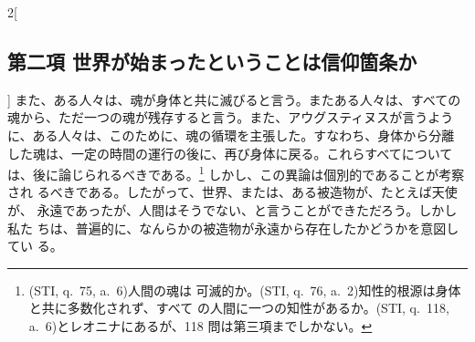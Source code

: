 \documentclass[paper=a4paper,fontsize=10pt,jafontsize=9pt,titlepage]{jlreq}
\begin{document}
\begin{paracol}{2}[\subsection{第二項 世界が始まったということは信仰箇条か}]
また、ある人々は、魂が身体と共に滅びると言う。またある人々は、すべての
魂から、ただ一つの魂が残存すると言う。また、アウグスティヌスが言うよう
に、ある人々は、このために、魂の循環を主張した。すなわち、身体から分離
した魂は、一定の時間の運行の後に、再び身体に戻る。これらすべてについて
は、後に論じられるべきである。\footnote {(STI, q.~75, a.~6)人間の魂は
可滅的か。(STI, q.~76, a.~2)知性的根源は身体と共に多数化されず、すべて
の人間に一つの知性があるか。(STI, q.~118, a.~6)とレオニナにあるが、118
問は第三項までしかない。} しかし、この異論は個別的であることが考察され
るべきである。したがって、世界、または、ある被造物が、たとえば天使が、
永遠であったが、人間はそうでない、と言うことができただろう。しかし私た
ちは、普遍的に、なんらかの被造物が永遠から存在したかどうかを意図してい
る。


\switchcolumn*



\end{paracol}

\newpage
{}
\end{document}
